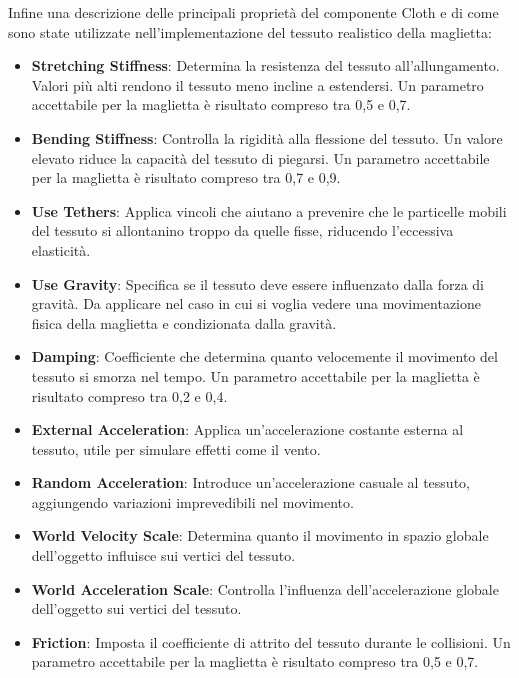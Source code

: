 \documentclass[11pt]{report}
\begin{document}
Infine una descrizione delle principali proprietà del componente Cloth e di come sono state utilizzate nell'implementazione del tessuto realistico della maglietta:
\begin{itemize}
    \item \textbf{Stretching Stiffness}: Determina la resistenza del tessuto all'allungamento. Valori più alti rendono il tessuto meno incline a estendersi. Un parametro accettabile per la maglietta è risultato compreso tra 0,5 e 0,7.

    \item \textbf{Bending Stiffness}: Controlla la rigidità alla flessione del tessuto. Un valore elevato riduce la capacità del tessuto di piegarsi. Un parametro accettabile per la maglietta è risultato compreso tra 0,7 e 0,9.

    
    \item \textbf{Use Tethers}: Applica vincoli che aiutano a prevenire che le particelle mobili del tessuto si allontanino troppo da quelle fisse, riducendo l'eccessiva elasticità.
    
    \item \textbf{Use Gravity}: Specifica se il tessuto deve essere influenzato dalla forza di gravità. Da applicare nel caso in cui si voglia vedere una movimentazione fisica della maglietta e condizionata dalla gravità.
    
    \item \textbf{Damping}: Coefficiente che determina quanto velocemente il movimento del tessuto si smorza nel tempo.  Un parametro accettabile per la maglietta è risultato compreso tra 0,2 e 0,4.
    
    \item \textbf{External Acceleration}: Applica un'accelerazione costante esterna al tessuto, utile per simulare effetti come il vento.
    
    \item \textbf{Random Acceleration}: Introduce un'accelerazione casuale al tessuto, aggiungendo variazioni imprevedibili nel movimento.
    
    \item \textbf{World Velocity Scale}: Determina quanto il movimento in spazio globale dell'oggetto influisce sui vertici del tessuto.
    
    \item \textbf{World Acceleration Scale}: Controlla l'influenza dell'accelerazione globale dell'oggetto sui vertici del tessuto.
    
    \item \textbf{Friction}: Imposta il coefficiente di attrito del tessuto durante le collisioni.  Un parametro accettabile per la maglietta è risultato compreso tra 0,5 e 0,7.
    

\end{itemize}
\end{document}
